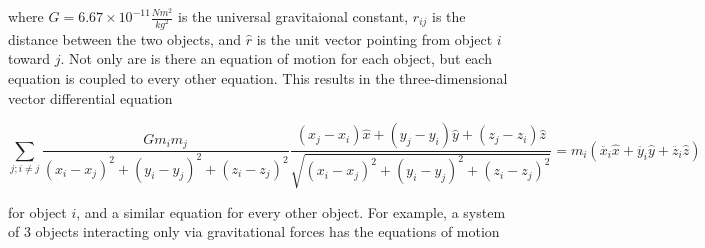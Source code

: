 \documentclass{report}
\begin{document}
            where $G = 6.67 \times 10^{-11} \frac{N m^2}{kg^2}$ is the universal gravitaional constant, $r_{ij}$ is the distance between the two objects, and $\hat{r}$ is the unit vector pointing from object $i$ toward $j$.  Not only are is there an equation of motion for each object, but each equation is coupled to every other equation.  This results in the three-dimensional vector differential equation\cite{taylor2005classical}

            \begin{equation}
                \sum_{j; i \neq j} \frac{G m_i m_j}{(x_i - x_j)^2 + (y_i - y_j)^2 + (z_i - z_j)^2} \frac{(x_j - x_i) \hat{x} + (y_j - y_i) \hat{y} + (z_j - z_i) \hat{z}}{\sqrt{(x_i - x_j)^2 + (y_i - y_j)^2 + (z_i - z_j)^2}} = m_i (\ddot{x_i} \hat{x} + \ddot{y_i} \hat{y} + \ddot{z_i} \hat{z})
            \end{equation}

            for object $i$, and a similar equation for every other object.  For example, a system of 3 objects interacting only via gravitational forces has the equations of motion 
\end{document}
